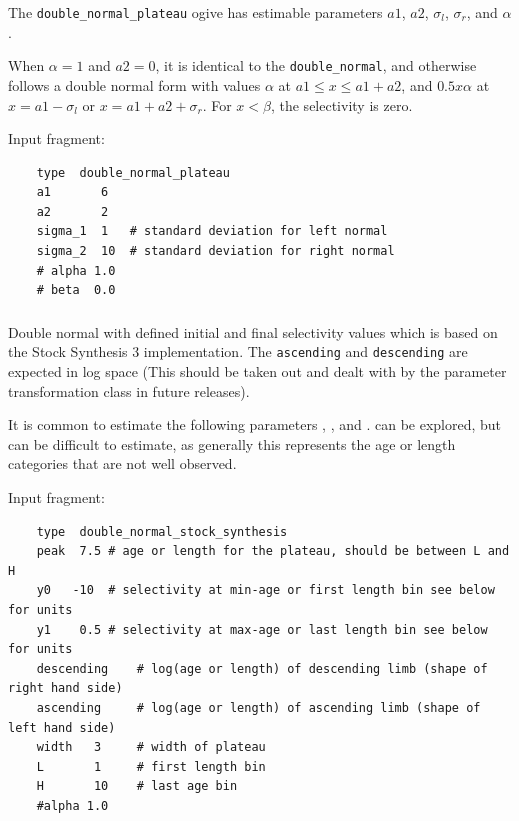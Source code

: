 The \texttt{double\_normal\_plateau} ogive has estimable parameters \(a1\), \(a2\), \(\sigma_l\), \(\sigma_r\), and \(\alpha\). 

When \(\alpha = 1\) and \(a2 = 0\), it is identical to the \texttt{double\_normal}, and otherwise follows a double normal form with values \(\alpha\) at \(a1 \le x \leq a1+a2\), and \(0.5 x \alpha\) at \(x= a1-\sigma_l\) or \(x=a1+a2+\sigma_r\). For $x < \beta$, the selectivity is zero.

Input fragment: {\small{\begin{verbatim}
	type  double_normal_plateau
	a1       6    
	a2 	     2
	sigma_1  1   # standard deviation for left normal
	sigma_2  10  # standard deviation for right normal
	# alpha 1.0
	# beta  0.0
\end{verbatim}}}

\subsubsection[Double normal Stock Synthesis]{}  \label{sec:Selectivity-DoubleNormalStockSynthesis}

Double normal with defined initial and final selectivity values which is based on the Stock Synthesis 3 implementation. The \texttt{ascending} and \texttt{descending} are expected in log space (This should be taken out and dealt with by the parameter transformation class in future releases).

It is common to estimate the following parameters , ,  and .  can be explored, but can be difficult to estimate, as generally this represents the age or length categories that are not well observed.

Input fragment: {\small{\begin{verbatim}
	type  double_normal_stock_synthesis
	peak  7.5 # age or length for the plateau, should be between L and H
	y0	 -10  # selectivity at min-age or first length bin see below for units
	y1	  0.5 # selectivity at max-age or last length bin see below for units
	descending 	  # log(age or length) of descending limb (shape of right hand side) 
	ascending 	  # log(age or length) of ascending limb (shape of left hand side) 
	width   3     # width of plateau
	L  		1     # first length bin
	H 		10    # last age bin
	#alpha 1.0
\end{verbatim}}}

